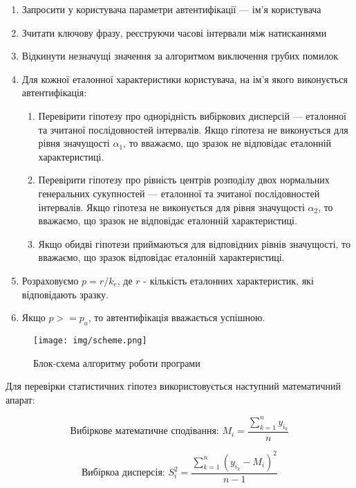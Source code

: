 \documentclass{dstu}
\begin{document}
\begin{enumerate}
	\item Запросити у користувача параметри автентифікації — ім'я користувача
	\item Зчитати ключову фразу, реєструючи часові інтервали між натисканнями
	\item Відкинути незначущі значення за алгоритмом виключення грубих помилок
	\item Для кожної еталонної характеристики користувача, на ім'я якого виконується автентифікація:
	\begin{enumerate}
		\item Перевірити гіпотезу про однорідність вибіркових дисперсій
		— еталонної та зчитаної послідовностей інтервалів. Якщо гіпотеза не виконується для рівня значущості $\alpha_1$, то вважаємо,
		що зразок не відповідає еталонній характеристиці.
		\item Перевірити гіпотезу про рівність центрів розподілу двох нормальних генеральних сукупностей
		— еталонної та зчитаної послідовностей інтервалів. Якщо гіпотеза не виконується для рівня значущості $\alpha_2$, то вважаємо,
		що зразок не відповідає еталонній характеристиці.
		\item Якщо обидві гіпотези приймаються для відповідних рівнів значущості, то вважаємо,
		що зразок відповідає еталонній характеристиці.
	\end{enumerate}
	\item Розраховуємо $p = r / k_e$, де $r$ - кількість еталонних характеристик, які відповідають зразку.
	\item Якщо $p >= p_a$, то автентифікація вважається успішною.
\end{enumerate}

\begin{figure}[!htp]
	\centering
	\texttt{[image: img/scheme.png]}
	\caption{Блок-схема алгоритму роботи програми}
	\label{fig:figure1}
\end{figure}

\bigskip
Для перевірки статистичних гіпотез використовується наступний математичний апарат:

\begin{equation}
	\label{eq:1}
	\text{Вибіркове математичне сподівання: }
	M_i = \frac{\sum^{n}_{k=1}{y_{i_{k}}}}{n}
\end{equation}

\begin{equation}
	\label{eq:2}
	\text{Вибіркоа дисперсія: }
	S_i^2 = \frac{\sum^{n}_{k=1}{(y_{i_{k}} - M_i)^2}}{n-1}
\end{equation}
\end{document}

